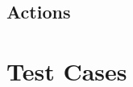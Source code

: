 \documentclass[12pt,a4paper]{article}
\begin{document}
\subsubsection{}

\subsubsection{}

\subsection{Actions}

\section{Test Cases}


\end{document}
